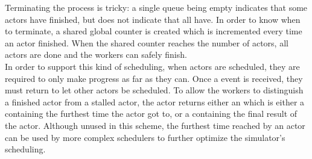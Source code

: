 Terminating the process is tricky: a single queue being empty indicates that some actors have finished, but does not indicate that all have.
In order to know when to terminate, a shared global counter is created which is incremented every time an actor finished.
When the shared counter reaches the number of actors, all actors are done and the workers can safely finish.
\\

In order to support this kind of scheduling, when actors are scheduled, they are required to only make progress as far as they can.
Once a  event is received, they must return to let other actors be scheduled.
To allow the workers to distinguish a finished actor from a stalled actor, the actor returns either an  which is either a  containing the furthest time the actor got to, or a  containing the final result of the actor.
Although unused in this scheme, the furthest time reached by an actor can be used by more complex schedulers to further optimize the simulator's scheduling.
